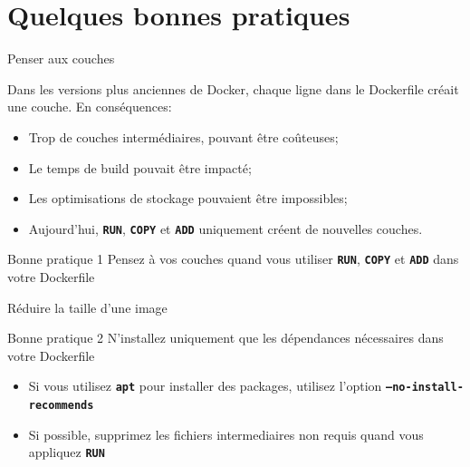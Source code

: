 \documentclass[aspectratio=169,10pt]{beamer}
\begin{document}
\section{Quelques bonnes pratiques}

\begin{frame}{Penser aux couches}

Dans les versions plus anciennes de Docker, chaque ligne dans le Dockerfile créait une couche. En conséquences:
\begin{itemize}
    \item Trop de couches intermédiaires, pouvant être coûteuses;
    \item Le temps de build pouvait être impacté;
    \item Les optimisations de stockage pouvaient être impossibles;
    \item Aujourd'hui, \texttt{\textbf{RUN}}, \texttt{\textbf{COPY}} et \texttt{\textbf{ADD}} uniquement créent de nouvelles couches.
\end{itemize}

\begin{alertblock}{Bonne pratique 1}
Pensez à vos couches quand vous utiliser \texttt{\textbf{RUN}}, \texttt{\textbf{COPY}} et \texttt{\textbf{ADD}} dans votre Dockerfile
\end{alertblock}

\end{frame}


\begin{frame}{Réduire la taille d'une image}

\begin{alertblock}{Bonne pratique 2}
N'installez uniquement que les dépendances nécessaires dans votre Dockerfile
\end{alertblock}

\begin{itemize}
    \item Si vous utilisez \texttt{\textbf{apt}} pour installer des packages, utilisez l'option \texttt{\textbf{--no-install-recommends}}
    \item Si possible, supprimez les fichiers intermediaires non requis quand vous appliquez \texttt{\textbf{RUN}}
\end{itemize}

\end{frame}

\end{document}
